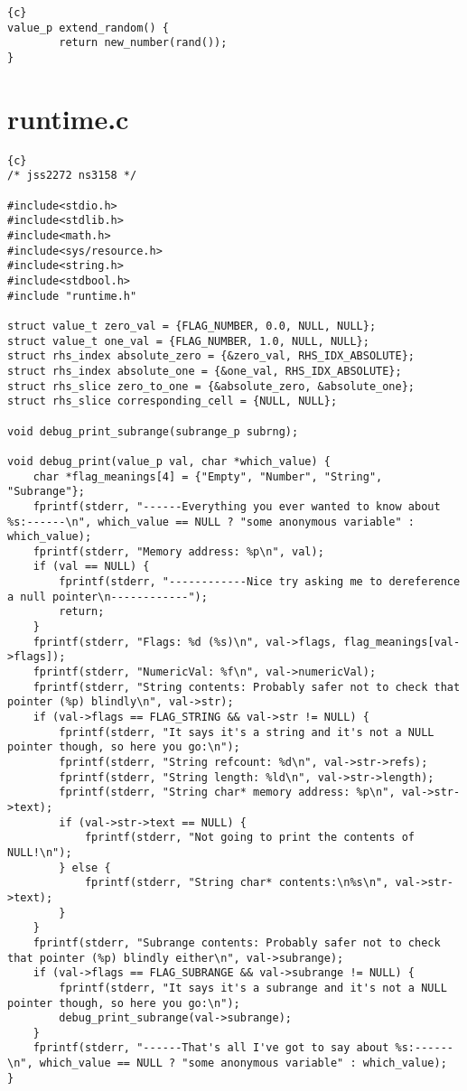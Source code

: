 \begin{lstlisting}{c}
value_p extend_random() {
        return new_number(rand());
}
\end{lstlisting}
\section{runtime.c}
\begin{lstlisting}{c}
/* jss2272 ns3158 */

#include<stdio.h>
#include<stdlib.h>
#include<math.h>
#include<sys/resource.h>
#include<string.h>
#include<stdbool.h>
#include "runtime.h"

struct value_t zero_val = {FLAG_NUMBER, 0.0, NULL, NULL};
struct value_t one_val = {FLAG_NUMBER, 1.0, NULL, NULL};
struct rhs_index absolute_zero = {&zero_val, RHS_IDX_ABSOLUTE};
struct rhs_index absolute_one = {&one_val, RHS_IDX_ABSOLUTE};
struct rhs_slice zero_to_one = {&absolute_zero, &absolute_one};
struct rhs_slice corresponding_cell = {NULL, NULL};

void debug_print_subrange(subrange_p subrng);

void debug_print(value_p val, char *which_value) {
	char *flag_meanings[4] = {"Empty", "Number", "String", "Subrange"};
	fprintf(stderr, "------Everything you ever wanted to know about %s:------\n", which_value == NULL ? "some anonymous variable" : which_value);
	fprintf(stderr, "Memory address: %p\n", val);
	if (val == NULL) {
		fprintf(stderr, "------------Nice try asking me to dereference a null pointer\n------------");
		return;
	}
	fprintf(stderr, "Flags: %d (%s)\n", val->flags, flag_meanings[val->flags]);
	fprintf(stderr, "NumericVal: %f\n", val->numericVal);
	fprintf(stderr, "String contents: Probably safer not to check that pointer (%p) blindly\n", val->str);
	if (val->flags == FLAG_STRING && val->str != NULL) {
		fprintf(stderr, "It says it's a string and it's not a NULL pointer though, so here you go:\n");
		fprintf(stderr, "String refcount: %d\n", val->str->refs);
		fprintf(stderr, "String length: %ld\n", val->str->length);
		fprintf(stderr, "String char* memory address: %p\n", val->str->text);
		if (val->str->text == NULL) {
			fprintf(stderr, "Not going to print the contents of NULL!\n");
		} else {
			fprintf(stderr, "String char* contents:\n%s\n", val->str->text);
		}
	}
	fprintf(stderr, "Subrange contents: Probably safer not to check that pointer (%p) blindly either\n", val->subrange);
	if (val->flags == FLAG_SUBRANGE && val->subrange != NULL) {
		fprintf(stderr, "It says it's a subrange and it's not a NULL pointer though, so here you go:\n");
		debug_print_subrange(val->subrange);
	}
	fprintf(stderr, "------That's all I've got to say about %s:------\n", which_value == NULL ? "some anonymous variable" : which_value);
}


\end{lstlisting}
